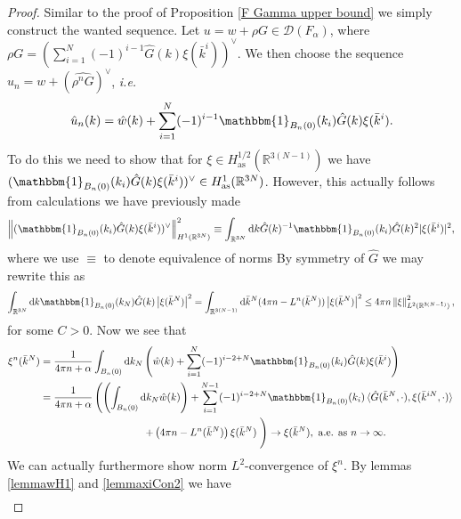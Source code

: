 \documentclass[a4paper,11pt]{article}
\newcommand{\norm}[1]{\left\lVert #1 \right\rVert}
\newcommand{\abs}[1]{\left\lvert #1 \right\rvert}
\newcommand{\dom}[1]{\mathscr D\left(#1\right)}
\newcommand*\diff{\mathop{}\!\mathrm{d}}
\newcommand{\ie}{\emph{i.e.} }
\newcommand{\R}{\mathbb{R}}
\numberwithin{equation}{section}
\begin{document}
\begin{proof}
	Similar to the proof of Proposition \ref{F Gamma upper bound} we simply construct the wanted sequence. Let $ u=w+\rho G \in\dom{F_\alpha}$, where $ \rho G=\left(\sum_{i=1}^{N}(-1)^{i-1}\hat{G}(k)\xi(\bar{k}^i)\right)^\vee $. We then choose the sequence $ u_n=w+(\widehat{\rho^nG})^\vee $, \ie\begin{equation}
	\hat{u}_n(k)=\hat{w}(k)+\sum_{i=1}^{N}(-1)^{i-1}\mathbbm{1}_{B_n(0)}(k_i)\hat{G}(k)\xi(\bar{k}^i).
	\end{equation}
	To do this we need to show that for $ \xi\in H_{\text{as}}^{1/2}(\R^{3(N-1)}) $ we have $ (\mathbbm{1}_{B_n(0)}(k_i)\hat{G}(k)\xi(\bar{k}^i))^\vee \in H_{\text{as}}^1(\R^{3N}) $. However, this actually follows from calculations we have previously made\begin{equation}
	\norm{(\mathbbm{1}_{B_n(0)}(k_i)\hat{G}(k)\xi(\bar{k}^i))^\vee}_{H^1(\R^{3N})}^2\equiv\int_{\R^{3N}}\diff k \hat{G}(k)^{-1}\mathbbm{1}_{B_n(0)}(k_i)\hat{G}(k)^2\lvert\xi(\bar{k}^i)\rvert^2,
	\end{equation}
	where we use $ \equiv $ to denote equivalence of norms
	By symmetry of $ \hat{G} $ we may rewrite this as\begin{equation}
	\int_{\R^{3N}}\diff k \mathbbm{1}_{B_n(0)}(k_N)\hat{G}(k)\abs{\xi(\bar{k}^N)}^2=\int_{\R^{3(N-1)}}\diff\bar{k}^N(4\pi n-L^n(\bar{k}^N))\abs{\xi(\bar{k}^N)}^2\leq 4\pi n \norm{\xi}_{L^{2}(\R^{3(N-1)})}^2,
	\end{equation}
	for some $ C>0 $. Now we see that \begin{equation}
	\begin{aligned}
	\xi^n(\bar{k}^N)&=\frac{1}{4\pi n+\alpha}\int_{B_n(0)}\diff k_N \left(\hat{w}(k)+\sum_{i=1}^{N}(-1)^{i-2+N}\mathbbm{1}_{B_n(0)}(k_i)\hat{G}(k)\xi(\bar{k}^i)\right)\\
	&=\frac{1}{4\pi n+\alpha}\left(\left(\int_{B_n(0)}\diff k_N \hat{w}(k)\right)+\sum_{i=1}^{N-1}(-1)^{i-2+N}\mathbbm{1}_{B_n(0)}(k_i)\braket{\hat{G}(\bar{k}^N,\cdot),\xi(\bar{k}^{iN},\cdot)}\right.\\
	&\left.\qquad\qquad\qquad\qquad\qquad+\left(4\pi n-L^n(\bar{k}^N)\right)\xi(\bar{k}^N)\right.\Bigg)\to \xi(\bar{k}^N),\text{ a.e. as }n\to\infty.
	\end{aligned}
	\end{equation}
	We can actually furthermore show norm $ L^2 $-convergence of $ \xi^n $. By lemmas \ref{lemmawH1} and \ref{lemmaxiCon2} we have \begin{equation}\label{xiConvergence}
	\begin{aligned}

\end{aligned}
\end{equation}
\end{proof}
\end{document}
